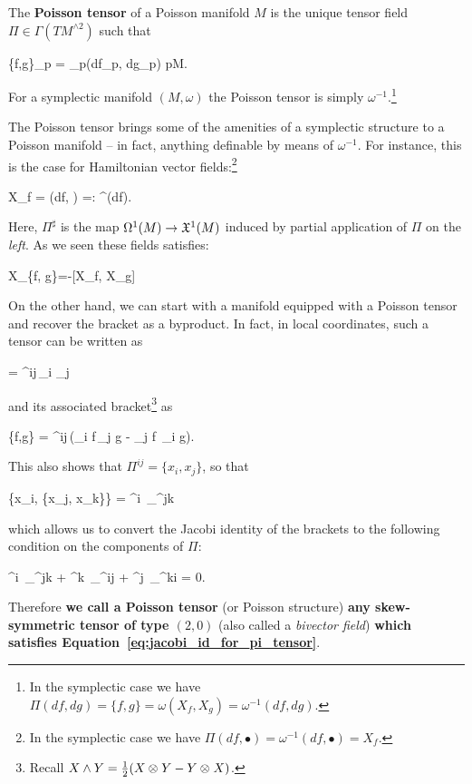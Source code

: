 \documentclass[main.tex]{subfiles}
\begin{document}
\begin{definition}
	The \textbf{Poisson tensor} of a Poisson manifold $M$ is the unique tensor field $\Pi \in  \Gamma(TM^{\wedge 2})$ such that
	\begin{eqalign}
		\{f,g\}\vert_p = \Pi\vert_p(df\vert_p, dg\vert_p) \quad \forall p\in M.
	\end{eqalign}
\end{definition}

\begin{example}
	For a symplectic manifold $(M, \omega)$ the Poisson tensor is simply $\omega^{-1}$.\footnote{In the symplectic case we have $\Pi(df, dg) = \{f, g\} = \omega(X_f, X_g)=\omega^{-1}(df, dg)$.}
\end{example}

The Poisson tensor brings some of the amenities of a symplectic structure to a Poisson manifold -- in fact, anything definable by means of $\omega^{-1}$. For instance, this is the case for Hamiltonian vector fields:\footnote{In the symplectic case we have $\Pi(df, \bullet) = \omega^{-1}(df, \bullet) = X_f$.}
\begin{eqalign}
\label{eq:ham_vf_from_pi}
	X_f = \Pi(df, \bullet) =: \Pi^\sharp(df).
\end{eqalign}
Here, $\Pi^\sharp$ is the map $\Omega^1(M) \to \mathfrak{X}^1(M)$ induced by partial application of $\Pi$ on the \emph{left}. As we seen these fields satisfies:
\begin{eqalign}
	X_{\{f, g\}}=-[X_f, X_g]
\end{eqalign}

On the other hand, we can start with a manifold equipped with a Poisson tensor and recover the bracket as a byproduct. In fact, in local coordinates, such a tensor can be written as
\begin{eqalign}
	\Pi =  \Pi^{ij}\,\partial_i \wedge \partial_j
\end{eqalign}
and its associated bracket\footnote{Recall $X \wedge Y = \frac12 (X \otimes_{} Y - Y \otimes_{} X)$.} as
\begin{eqalign}
	\{f,g\} =  \Pi^{ij}\,(\partial_i f\,\partial_j g - \partial_j f\, \partial_i g).
\end{eqalign}
This also shows that $\Pi^{ij} = \{x_i, x_j\}$, so that
\begin{eqalign}
	\{x_i, \{x_j, x_k\}\} =  \Pi^{i\ell}\, \partial_\ell \Pi^{jk}
\end{eqalign}
which allows us to convert the Jacobi identity of the brackets to the following condition on the components of $\Pi$:
\begin{eqalign}
\label{eq:jacobi_id_for_pi_tensor}
	\Pi^{i\ell}\, \partial_\ell \Pi^{jk} + \Pi^{k\ell}\, \partial_\ell \Pi^{ij} + \Pi^{j\ell}\, \partial_\ell \Pi^{ki} = 0.
\end{eqalign}
Therefore \textbf{we call a Poisson tensor} (or Poisson structure) \textbf{any skew-symmetric tensor of type $(2, 0)$} (also called a \emph{bivector field}) \textbf{which satisfies Equation~\ref{eq:jacobi_id_for_pi_tensor}}.
\end{document}
